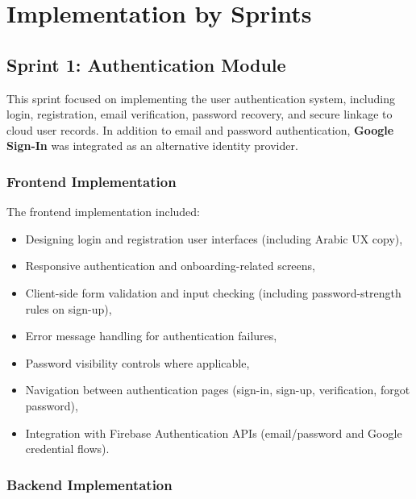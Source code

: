 \section{Implementation by Sprints}

\subsection{Sprint 1: Authentication Module}

This sprint focused on implementing the user authentication system, including login,
registration, email verification, password recovery, and secure linkage to cloud user
records. In addition to email and password authentication, \textbf{Google Sign-In} was
integrated as an alternative identity provider.

\subsubsection{Frontend Implementation}

The frontend implementation included:

\begin{itemize}
    \item Designing login and registration user interfaces (including Arabic UX copy),
    \item Responsive authentication and onboarding-related screens,
    \item Client-side form validation and input checking (including password-strength rules on sign-up),
    \item Error message handling for authentication failures,
    \item Password visibility controls where applicable,
    \item Navigation between authentication pages (sign-in, sign-up, verification, forgot password),
    \item Integration with Firebase Authentication APIs (email/password and Google credential flows).
\end{itemize}

\subsubsection{Backend Implementation}

